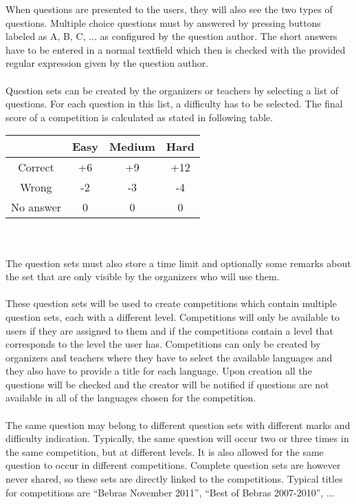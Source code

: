 	When questions are presented to the users, they will also see the two types of
	questions. Multiple choice questions must by answered by pressing buttons labeled as
	A, B, C, ... as configured by the question author. The short answers have to be
	entered in a normal textfield which then is checked with the provided regular
	expression given by the question author.\\
	\\
	Question sets can be created by the organizers or teachers by selecting a list of questions.
	For each question in this list, a difficulty has to be selected. The final score of a
	competition is calculated as stated in following table.\\
	\begin{tabular}{| c| c| c| c| }
	\hline
	  & Easy & Medium & Hard \\
	\hline
	  Correct & +6 & +9 & +12 \\
	\hline
	  Wrong & -2 & -3 & -4 \\
	\hline
	  No answer & 0 & 0 & 0 \\
	\hline
	\end{tabular}\\ \\
	The question sets must also store a time limit and optionally some remarks about the
	set that are only visible by the organizers who will use them. \\
	\\
	These question sets will be used to create competitions which contain multiple
	question sets, each with a different level. Competitions will only be available to users if
	they are assigned to them and if the competitions contain a level that corresponds to
	the level the user has. Competitions can only be created by organizers and teachers where they have
	to select the available languages and they also have to provide a title for each
	language. Upon creation all the questions will be checked and the creator will be
	notified if questions are not available in all of the languages chosen for the
	competition.\\
	\\
	The same question may belong to different question sets with different marks and
	difficulty indication. Typically, the same question will occur two or three times in
	the same competition, but at different levels. It is also allowed for the same
	question to occur in different competitions. Complete question sets are however never
	shared, so these sets are directly linked to the competitions. Typical titles for
	competitions are ``Bebras November 2011'', ``Best of Bebras 2007-2010'', ...
	
